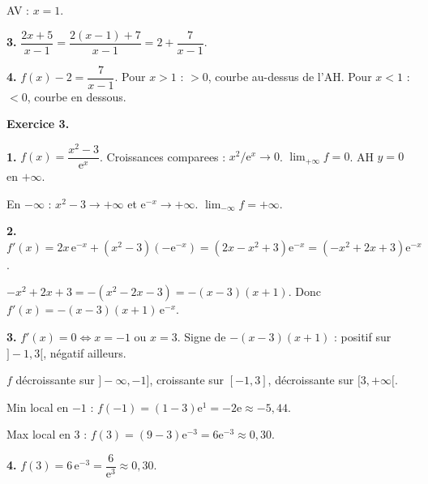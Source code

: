 AV : $x = 1$.

\textbf{3.} $\dfrac{2x+5}{x-1} = \dfrac{2(x-1)+7}{x-1} = 2 + \dfrac{7}{x-1}$.

\textbf{4.} $f(x) - 2 = \dfrac{7}{x-1}$. Pour $x > 1$ : $> 0$, courbe au-dessus de l'AH. Pour $x < 1$ : $< 0$, courbe en dessous.

\bigskip


\textbf{Exercice 3.}

\textbf{1.} $f(x) = \dfrac{x^2-3}{\mathrm{e}^x}$. Croissances comparees : $x^2/\mathrm{e}^x \to 0$. $\lim_{+\infty} f = \boxed{0}$. AH $y = 0$ en $+\infty$.

En $-\infty$ : $x^2-3 \to +\infty$ et $\mathrm{e}^{-x} \to +\infty$. $\lim_{-\infty} f = \boxed{+\infty}$.

\textbf{2.} $f'(x) = 2x\,\mathrm{e}^{-x} + (x^2-3)(-\mathrm{e}^{-x}) = (2x - x^2 + 3)\mathrm{e}^{-x} = (-x^2+2x+3)\mathrm{e}^{-x}$.

$-x^2+2x+3 = -(x^2-2x-3) = -(x-3)(x+1)$. Donc $f'(x) = -(x-3)(x+1)\,\mathrm{e}^{-x}$.

\textbf{3.} $f'(x) = 0 \iff x = -1$ ou $x = 3$. Signe de $-(x-3)(x+1)$ : positif sur $]-1, 3[$, négatif ailleurs.

$f$ décroissante sur $]-\infty, -1]$, croissante sur $[-1, 3]$, décroissante sur $[3, +\infty[$.

Min local en $-1$ : $f(-1) = (1-3)\mathrm{e}^1 = -2\mathrm{e} \approx -5{,}44$.

Max local en $3$ : $f(3) = (9-3)\mathrm{e}^{-3} = 6\mathrm{e}^{-3} \approx 0{,}30$.

\textbf{4.} $f(3) = 6\,\mathrm{e}^{-3} = \boxed{\dfrac{6}{\mathrm{e}^3}} \approx 0{,}30$.
